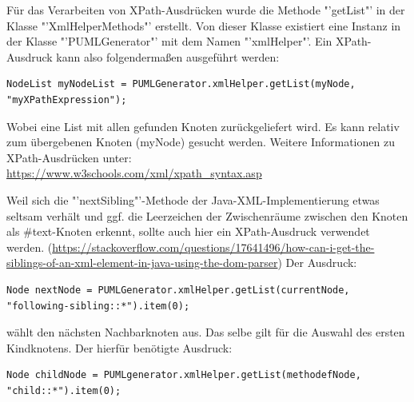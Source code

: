 Für das Verarbeiten von XPath-Ausdrücken wurde die Methode "'getList"' in der Klasse "'XmlHelperMethods"' erstellt. Von dieser Klasse existiert eine Instanz in der Klasse "'PUMLGenerator"' mit dem Namen "'xmlHelper"'. Ein XPath-Ausdruck kann also folgendermaßen ausgeführt werden:
\begin{lstlisting}
NodeList myNodeList = PUMLGenerator.xmlHelper.getList(myNode, "myXPathExpression");
\end{lstlisting}
Wobei eine List mit allen gefunden Knoten zurückgeliefert wird. Es kann relativ zum übergebenen Knoten (myNode) gesucht werden.
Weitere Informationen zu XPath-Ausdrücken unter:\\
\url{https://www.w3schools.com/xml/xpath_syntax.asp}
\nsecend

Weil sich die "'nextSibling"'-Methode der Java-XML-Implementierung etwas seltsam verhält und ggf. die Leerzeichen der Zwischenräume zwischen den Knoten als #text-Knoten erkennt, sollte auch hier ein XPath-Ausdruck verwendet werden. (\url{https://stackoverflow.com/questions/17641496/how-can-i-get-the-siblings-of-an-xml-element-in-java-using-the-dom-parser}) Der Ausdruck:
\begin{lstlisting}
Node nextNode = PUMLGenerator.xmlHelper.getList(currentNode, "following-sibling::*").item(0);
\end{lstlisting}
wählt den nächsten Nachbarknoten aus. Das selbe gilt für die Auswahl des ersten Kindknotens. Der hierfür benötigte Ausdruck:
\begin{lstlisting}
Node childNode = PUMLgenerator.xmlHelper.getList(methodefNode, "child::*").item(0);
\end{lstlisting}
\nsecend
\nsecend %

\nsecend %